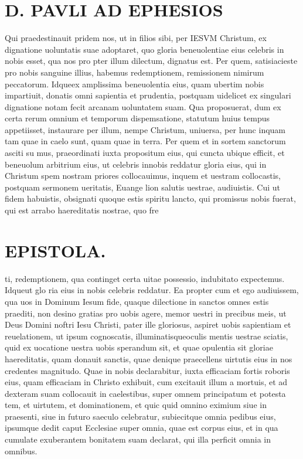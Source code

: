\documentclass{article}
\begin{document}
\begin{pages}
\section*{D. PAVLI AD EPHESIOS }
\marginpar{[ p.3.  ]}
\marginpar{[ p.4.  ]}
\marginpar{[ p.5.  ]}
\marginpar{[ p.6.  ]}
\marginpar{[ p.7.  ]}\pstart Qui praedestinauit pridem nos, ut in filios sibi, per IESVM Christum, ex dignatione uoluntatis suae adoptaret, quo gloria beneuolentiae eius celebris in nobis esset, qua nos pro pter illum dilectum, dignatus est.  \pend\pstart Per  quem, satisiacieste pro nobis sanguine illius, habemus redemptionem, remissionem nimirum peccatorum.  Idqueex amplissima beneuolentia eius, quam ubertim nobis impartiuit, donatis omni sapientia et prudentia, postquam uidelicet ex singulari dignatione notam fecit arcanam uoluntatem suam.  \pend\pstart Qua proposuerat, dum ex certa rerum omnium et temporum dispemsatione, statutum huius tempus appetiisset, instaurare per illum, nempe Christum, uniuersa, per hunc inquam tam quae in caelo sunt, quam quae in terra.  \pend\pstart Per quem et in sortem sanctorum asciti su mus, praeordinati iuxta propositum eius, qui cuncta ubique efficit, et beneuolum arbitrium eius, ut celebris innobis reddatur gloria eius, qui in Christum spem nostram priores collocauimus, inquem et uestram collocastis, postquam sermonem ueritatis, Euange lion salutis uestrae, audiuistis.  \pend\pstart Cui ut fidem habuistis, obsignati quoque estis spiritu lancto, qui promissus nobis fuerat, qui est arrabo haereditatis nostrae, quo fre  \pend
\section*{EPISTOLA. }
\marginpar{[ p.90 ]}
\marginpar{[ p.91 ]}
\marginpar{[ p.92 ]}\pstart ti, redemptionem, qua continget certa uitae possessio, indubitato expectemus. Idqueut glo ria eius in nobis celebris reddatur.  \pend\pstart Ea propter cum et ego audiuissem, qua uos in Dominum Iesum fide, quaque dilectione in sanctos omnes estis praediti, non desino gratias pro uobis agere, memor uestri in precibus meis, ut Deus Domini noftri Iesu Christi, pater ille gloriosus, aspiret uobis sapientiam et reuelationem, ut ipsum cognoscatis, illuminatisqueoculis mentis uestrae sciatis, quid ex uocatione uestra uobis sperandum sit, et quae opulentia sit gloriae haereditatis, quam donauit sanctis, quae denique praecellens uirtutis eius in nos credentes magnitudo.  \pend\pstart Quae in nobis declarabitur, iuxta efficaciam fortis roboris eius, quam efficaciam in Christo exhibuit, cum excitauit illum a mortuis, et ad dexteram suam collocauit in caelestibus, super omnem principatum et potesta tem, et uirtutem, et dominationem, et quic quid omnino eximium siue in praesenti, siue in futuro saeculo celebratur, subiecitque omnia pedibus eius, ipsumque dedit caput Ecclesiae super omnia, quae est corpus eius, et in qua cumulate exuberantem bonitatem suam declarat, qui illa perficit omnia in omnibus.  \pend

\end{pages}
\end{document}
